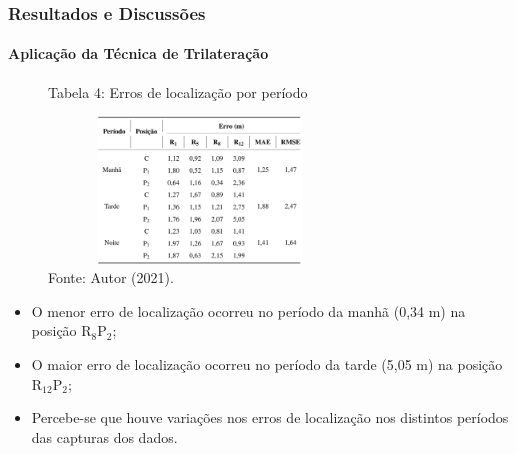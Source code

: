 \documentclass[xcolor={dvipsnames,svgnames,table}]{beamer}
\begin{document}
	\begin{frame}
		\frametitle{Resultados e Discussões}
		\framesubtitle{Aplicação da Técnica de Trilateração}
		\begin{figure}
			\caption*{Tabela 4: Erros de localização por período}
			\vspace{-5pt}
			\centering
			\includegraphics[width=8cm, height=3.9cm]{imgs/erros-localizacao.PNG}
			\vspace{-5pt}
			\caption*{\tiny{Fonte: Autor (2021).}}
			\vspace{-15pt}
		\end{figure}
		\begin{block}{}%
			\begin{itemize}[label=\textcolor{black}{\textbullet}, left=5pt]
				\justifying
				\item O menor erro de localização ocorreu no período da manhã (0,34 m) na posição R$_\text{8}$P$_\text{2}$;
				\item O maior erro de localização ocorreu no período da tarde (5,05 m) na posição R$_\text{12}$P$_\text{2}$;
				\item Percebe-se que houve variações nos erros de localização nos distintos períodos das capturas dos dados.%
			\end{itemize}
		\end{block}
		
	\end{frame}
\end{document}
